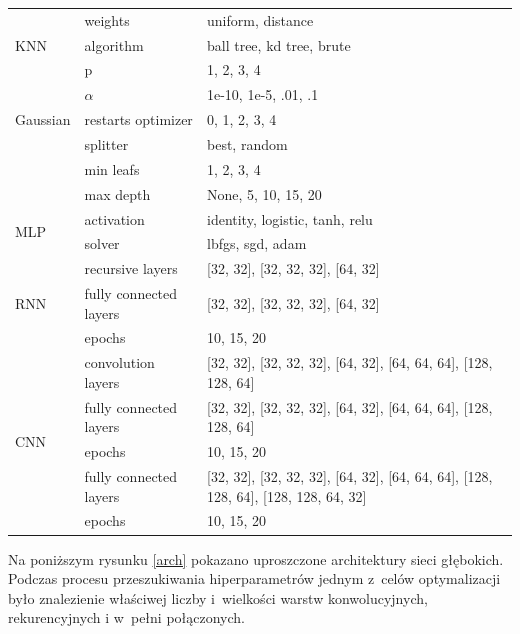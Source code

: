 \begin{table}[H]
    \centering
    \bigskip
    \begin{tabular}{|m{4cm}|m{4cm}|m{4cm}|}
    \hline
    \multirow{3}{*}{KNN} & weights & uniform, distance\\
    \cline{2-3}
     & algorithm & ball tree, kd tree, brute\\
    \cline{2-3}
        & p & 1, 2, 3, 4\\
    \hline
    \multirow{3}{*}{Gaussian} & $\alpha$ & 1e-10, 1e-5, .01, .1 \\
    \cline{2-3}
    & restarts optimizer & 0, 1, 2, 3, 4\\
    \hline
    \multirow{3}{*}{Drzewo decyzyjne} & splitter & best, random \\
    \cline{2-3}
     & min leafs & 1, 2, 3, 4\\
    \cline{2-3}
     & max depth & None, 5, 10, 15, 20\\
    \hline
    \multirow{2}{*}{MLP} & activation & identity, logistic, tanh, relu \\
    \cline{2-3}
     & solver & lbfgs, sgd, adam\\
    \hline
    \multirow{3}{*}{RNN} & recursive layers & [32, 32], [32, 32, 32], [64, 32] \\
    \cline{2-3}
     & fully connected layers & [32, 32], [32, 32, 32], [64, 32]\\
    \cline{2-3}
     & epochs & 10, 15, 20\\
    \hline
    \multirow{5}{*}{CNN} & convolution layers &                                   [32, 32],
    [32, 32, 32],
    [64, 32],
    [64, 64, 64],
    [128, 128, 64] \\
    \cline{2-3}
     & fully connected layers & 
     [32, 32],
     [32, 32, 32],
     [64, 32],
     [64, 64, 64],
     [128, 128, 64]\\
    \cline{2-3}
     & epochs & 10, 15, 20\\
    \hline
    \multirow{2}{*}{NN} & fully connected layers &                                   [32, 32],
    [32, 32, 32],
    [64, 32],
    [64, 64, 64],
    [128, 128, 64],
    [128, 128, 64, 32]\\
    \cline{2-3}
     & epochs & 10, 15, 20 \\
    \hline

    \end{tabular}
\end{table}

Na poniższym rysunku \ref{arch} pokazano uproszczone architektury sieci głębokich.
Podczas procesu przeszukiwania hiperparametrów jednym z~celów optymalizacji 
było znalezienie właściwej liczby i~wielkości warstw konwolucyjnych, rekurencyjnych
i w~pełni połączonych.

